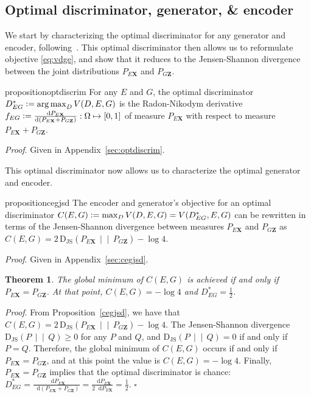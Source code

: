 \documentclass{article}
\newcommand{\proof}{\textit{Proof}.\xspace}
\newcommand{\jsd}[2]{\mathrm{D_{JS}}\left(\left.#1\,\middle|\middle|\,#2\right.\right)}
\newcommand{\defeq}{\vcentcolon=}
\renewcommand{\d}{\mathop{}\!\mathrm{d}}
\renewcommand{\vec}[1]{\mathbf{#1}}
\newcommand{\X}{\vec{X}}
\newcommand{\Z}{\vec{Z}}
\DeclareMathOperator*{\argmax}{arg\,max}
\begin{document}
\newtheorem{theorem}{Theorem}
\newtheorem{corollary}{Corollary}
\newtheorem{proposition}{Proposition}
\newtheorem{lemma}{Lemma}

\subsection{Optimal discriminator, generator, \& encoder}
We start by characterizing the optimal discriminator for any generator and encoder,
following~\citet{gan}.
This optimal discriminator then allows us to reformulate objective \eqref{eq:vdge},
and show that it reduces to the Jensen-Shannon divergence between the joint distributions $P_{E\X}$ and $P_{G\Z}$.
\begin{restatable}{proposition}{optdiscrim}
\label{eq:optdiscrim}
For any $E$ and $G$, the optimal discriminator $
D^*_{EG} \defeq
\argmax_D V(D, E, G)
$ is the Radon-Nikodym derivative $
f_{EG} \defeq
\frac{\d P_{E\X}}{\d (P_{E\X} + P_{G\Z})}
: \Omega \mapsto [0, 1]
$
of measure $
P_{E\X}
$ with respect to measure $
P_{E\X} + P_{G\Z}
$.
\end{restatable}
\proof Given in Appendix~\ref{sec:optdiscrim}.

This optimal discriminator now allows us to characterize the optimal generator and encoder.

\begin{restatable}{proposition}{cegjsd}
\label{cegjsd}
The encoder and generator's objective for an optimal discriminator $
C(E, G)
\defeq
\max_D
V(D, E, G)
=
V(D^*_{EG}, E, G)
$ can be rewritten in terms of the Jensen-Shannon divergence between measures $P_{E\X}$ and $P_{G\Z}$ as $
C(E, G)
=
2 \, \jsd{P_{E\X}}{P_{G\Z}} - \log 4
$.
\end{restatable}
\proof Given in Appendix~\ref{sec:cegjsd}.

\begin{theorem}
The global minimum of $
C(E, G)
$
is achieved if and only if $
P_{E\X} = P_{G\Z}
$.
At that point, $C(E, G) = - \log 4$ and $D^*_{EG} = \frac{1}{2}$.
\label{thm:optgen}
\end{theorem}

\proof
From Proposition~\ref{cegjsd}, we have that $
C(E, G) =
2 \, \jsd{P_{E\X}}{P_{G\Z}} - \log 4
$.
The Jensen-Shannon divergence $\jsd{P}{Q} \ge 0$ for any $P$ and $Q$,
and $\jsd{P}{Q}=0$ if and only if $P = Q$.
Therefore, the global minimum of $
C(E, G)
$ occurs if and only if $
P_{E\X} = P_{G\Z}
$,
and at this point the value is $
C(E, G)
=
- \log 4
$.
Finally, $
P_{E\X} = P_{G\Z}
$ implies that the optimal discriminator is chance: $
D^*_{EG} =
\tfrac{\d P_{E\X}}{\d(P_{E\X} + P_{G\Z})} =
\tfrac{\d P_{E\X}}{2 \d P_{E\X}} =
\tfrac{1}{2}
$.
$\square$
\end{document}
